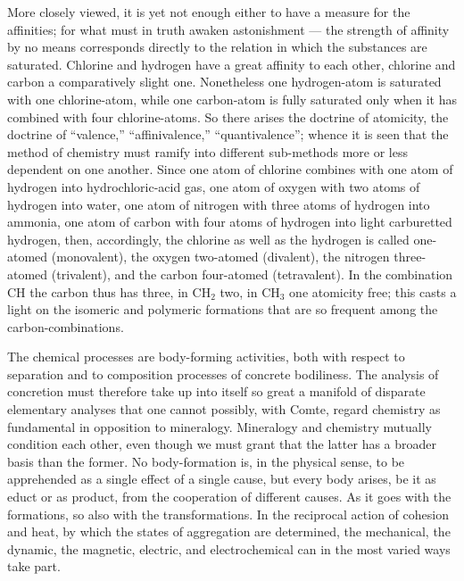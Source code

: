 \documentclass[12pt]{book}
\begin{document}
More closely viewed, it is yet not enough either to have a measure for the affinities;
for what must in truth awaken astonishment --- the strength of affinity by no means
corresponds directly to the relation in which the substances are saturated. Chlorine
and hydrogen have a great affinity to each other, chlorine and carbon a comparatively
slight one. Nonetheless one hydrogen-atom is saturated with one chlorine-atom, while
one carbon-atom is fully saturated only when it has combined with four chlorine-atoms.
So there arises the doctrine of atomicity, the doctrine of ``valence,''
``affinivalence,'' ``quantivalence''; whence it is seen that the method of chemistry
must ramify into different sub-methods more or less dependent on one another. Since one
atom of chlorine combines with one atom of hydrogen into hydrochloric-acid gas, one
atom of oxygen with two atoms of hydrogen into water, one atom of nitrogen with three
atoms of hydrogen into ammonia, one atom of carbon with four atoms of hydrogen into
light carburetted hydrogen, then, accordingly, the chlorine as well as the hydrogen is
called one-atomed (monovalent), the oxygen two-atomed (divalent), the nitrogen
three-atomed (trivalent), and the carbon four-atomed (tetravalent). In the combination
$\mathrm{CH}$ the carbon thus has three, in $\mathrm{CH_2}$ two, in $\mathrm{CH_3}$ one
atomicity free; this casts a light on the isomeric and polymeric formations that are so
frequent among the carbon-combinations.

The chemical processes are body-forming activities, both with respect to separation
and to composition processes of concrete bodiliness. The analysis of concretion must
therefore take up into itself so great a manifold of disparate elementary analyses that
one cannot possibly, with Comte, regard chemistry as fundamental in opposition to
mineralogy. Mineralogy and chemistry mutually condition each other, even though we must
grant that the latter has a broader basis than the former. No body-formation is, in the
physical sense, to be apprehended as a single effect of a single cause, but every body
arises, be it as educt or as product, from the cooperation of different causes. As it
goes with the formations, so also with the transformations. In the reciprocal action of
cohesion and heat, by which the states of aggregation are determined, the mechanical,
the dynamic, the magnetic, electric, and electrochemical can in the most varied ways
take part.
\end{document}
